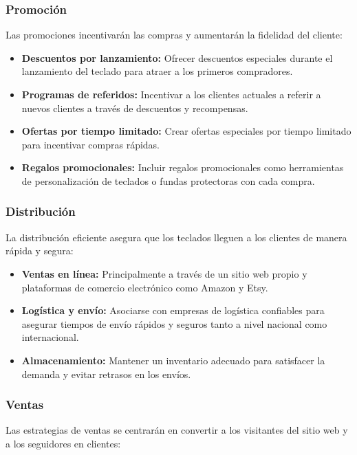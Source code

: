 \subsubsection{Promoción}

Las promociones incentivarán las compras y aumentarán la fidelidad del cliente:

\begin{itemize}
    \item \textbf{Descuentos por lanzamiento:} Ofrecer descuentos especiales durante el lanzamiento del teclado para atraer a los primeros compradores.
    \item \textbf{Programas de referidos:} Incentivar a los clientes actuales a referir a nuevos clientes a través de descuentos y recompensas.
    \item \textbf{Ofertas por tiempo limitado:} Crear ofertas especiales por tiempo limitado para incentivar compras rápidas.
    \item \textbf{Regalos promocionales:} Incluir regalos promocionales como herramientas de personalización de teclados o fundas protectoras con cada compra.
\end{itemize}

\subsubsection{Distribución}

La distribución eficiente asegura que los teclados lleguen a los clientes de manera rápida y segura:

\begin{itemize}
    \item \textbf{Ventas en línea:} Principalmente a través de un sitio web propio y plataformas de comercio electrónico como Amazon y Etsy.
    \item \textbf{Logística y envío:} Asociarse con empresas de logística confiables para asegurar tiempos de envío rápidos y seguros tanto a nivel nacional como internacional.
    \item \textbf{Almacenamiento:} Mantener un inventario adecuado para satisfacer la demanda y evitar retrasos en los envíos.
\end{itemize}

\subsubsection{Ventas}

Las estrategias de ventas se centrarán en convertir a los visitantes del sitio web y a los seguidores en clientes:

